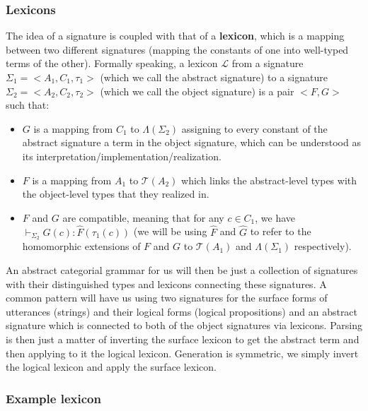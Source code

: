 \documentclass{article}
\begin{document}
\subsubsection{Lexicons}

The idea of a signature is coupled with that of a \textbf{lexicon},
which is a mapping between two different signatures (mapping the
constants of one into well-typed terms of the other). Formally speaking,
a lexicon $\mathcal{L}$ from a signature $\Sigma_1 = \mathopen{<}A_1, C_1,
\tau_1\mathclose{>}$ (which we call the abstract signature) to a
signature $\Sigma_2 = \mathopen{<}A_2, C_2, \tau_2\mathclose{>}$ (which
we call the object signature) is a pair $\mathopen{<}F, G\mathclose{>}$
such that:
\begin{itemize}
\item $G$ is a mapping from $C_1$ to $\Lambda(\Sigma_2)$ assigning to
  every constant of the abstract signature a term in the object
  signature, which can be understood as its
  interpretation/implementation/realization.
\item $F$ is a mapping from $A_1$ to $\mathcal{T}(A_2)$ which links the
  abstract-level types with the object-level types that they realized
  in.
\item $F$ and $G$ are compatible, meaning that for any $c \in C_1$, we
  have $\vdash_{\Sigma_2} G(c) : \hat{F}(\tau_1(c))$ (we will be using
  $\hat{F}$ and $\hat{G}$ to refer to the homomorphic extensions of $F$
  and $G$ to $\mathcal{T}(A_1)$ and $\Lambda(\Sigma_1)$ respectively).
\end{itemize}

An abstract categorial grammar for us will then be just a collection of
signatures with their distinguished types and lexicons connecting these
signatures. A common pattern will have us using two signatures for the
surface forms of utterances (strings) and their logical forms (logical
propositions) and an abstract signature which is connected to both of
the object signatures via lexicons. Parsing is then just a matter of
inverting the surface lexicon to get the abstract term and then applying
to it the logical lexicon. Generation is symmetric, we simply invert the
logical lexicon and apply the surface lexicon.

\subsubsection{Example lexicon}

\newcommand{\synt}[1]{C_{\textrm{#1}}}
\end{document}
